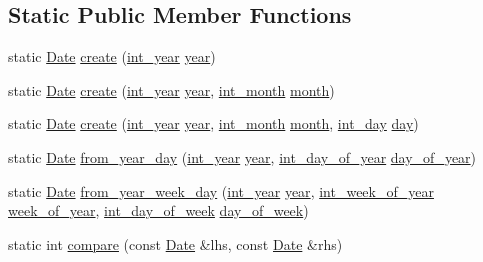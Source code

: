 \subsection*{\-Static \-Public \-Member \-Functions}
\begin{DoxyCompactItemize}
\item 
static \hyperlink{structDate}{\-Date} \hyperlink{structDate_af6a6aa2e75464311dc7eee91e25aee47}{create} (\hyperlink{types_8h_a7ff53e164374f5b24e06f3c04362e61d}{int\-\_\-year} \hyperlink{structDate_aac4f4635d8db0ea1a32c2f979a1a6cc0}{year})
\item 
static \hyperlink{structDate}{\-Date} \hyperlink{structDate_a0b1280e69ec6310ec8cdfb730e8dd7f6}{create} (\hyperlink{types_8h_a7ff53e164374f5b24e06f3c04362e61d}{int\-\_\-year} \hyperlink{structDate_aac4f4635d8db0ea1a32c2f979a1a6cc0}{year}, \hyperlink{types_8h_a6e77e4e37237551e3c2f808f02764cec}{int\-\_\-month} \hyperlink{structDate_a39f4a9fd570f306025f78447477e42d6}{month})
\item 
static \hyperlink{structDate}{\-Date} \hyperlink{structDate_ae0bcc2332237bf0f5b57ed646a00e6ac}{create} (\hyperlink{types_8h_a7ff53e164374f5b24e06f3c04362e61d}{int\-\_\-year} \hyperlink{structDate_aac4f4635d8db0ea1a32c2f979a1a6cc0}{year}, \hyperlink{types_8h_a6e77e4e37237551e3c2f808f02764cec}{int\-\_\-month} \hyperlink{structDate_a39f4a9fd570f306025f78447477e42d6}{month}, \hyperlink{types_8h_a2ee09cac57b5b71a2cf76051e877f320}{int\-\_\-day} \hyperlink{structDate_ac4993265144899a83ee57cd6d54d3bff}{day})
\item 
static \hyperlink{structDate}{\-Date} \hyperlink{structDate_af3a7ed97e385d134e39c42092d082405}{from\-\_\-year\-\_\-day} (\hyperlink{types_8h_a7ff53e164374f5b24e06f3c04362e61d}{int\-\_\-year} \hyperlink{structDate_aac4f4635d8db0ea1a32c2f979a1a6cc0}{year}, \hyperlink{types_8h_ae73cc4736210d3120e1073d94bbac092}{int\-\_\-day\-\_\-of\-\_\-year} \hyperlink{structDate_aa1aaeb37af12be4ac07337b5e4ba8206}{day\-\_\-of\-\_\-year})
\item 
static \hyperlink{structDate}{\-Date} \hyperlink{structDate_a88c032d0e05efa136df450f1d3564760}{from\-\_\-year\-\_\-week\-\_\-day} (\hyperlink{types_8h_a7ff53e164374f5b24e06f3c04362e61d}{int\-\_\-year} \hyperlink{structDate_aac4f4635d8db0ea1a32c2f979a1a6cc0}{year}, \hyperlink{types_8h_af13e483c5f00ae8ea8ada4c7f5fad337}{int\-\_\-week\-\_\-of\-\_\-year} \hyperlink{structDate_af051f922cdc105f86b92fc6d8bbdfa90}{week\-\_\-of\-\_\-year}, \hyperlink{types_8h_a78b244794c680f1753a6d92eed77aeda}{int\-\_\-day\-\_\-of\-\_\-week} \hyperlink{structDate_ac85eed3a3b2d579cdc74b2af801740b0}{day\-\_\-of\-\_\-week})
\item 
static int \hyperlink{structDate_afc234509ba1c8b1717e52181e7ad256d}{compare} (const \hyperlink{structDate}{\-Date} \&lhs, const \hyperlink{structDate}{\-Date} \&rhs)
\end{DoxyCompactItemize}
